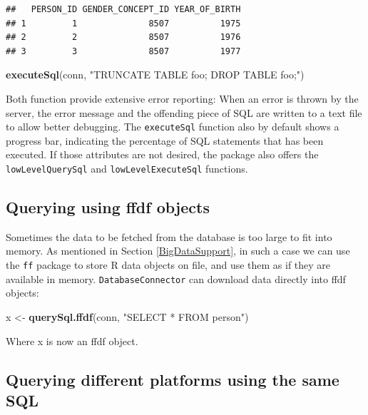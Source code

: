 \documentclass[11pt]{book}
\newenvironment{Shaded}{\begin{snugshade}}{\end{snugshade}}
\newcommand{\KeywordTok}[1]{\textcolor[rgb]{0.13,0.29,0.53}{\textbf{#1}}}
\newcommand{\NormalTok}[1]{#1}
\newcommand{\StringTok}[1]{\textcolor[rgb]{0.31,0.60,0.02}{#1}}
\theoremstyle{definition}
\theoremstyle{definition}
\theoremstyle{definition}
\theoremstyle{remark}
\begin{document}
\begin{verbatim}
##   PERSON_ID GENDER_CONCEPT_ID YEAR_OF_BIRTH
## 1         1              8507          1975
## 2         2              8507          1976
## 3         3              8507          1977
\end{verbatim}

\begin{Shaded}
\begin{Highlighting}[]
\KeywordTok{executeSql}\NormalTok{(conn, }\StringTok{"TRUNCATE TABLE foo; DROP TABLE foo;"}\NormalTok{)}
\end{Highlighting}
\end{Shaded}

Both function provide extensive error reporting: When an error is thrown by the server, the error message and the offending piece of SQL are written to a text file to allow better debugging. The \texttt{executeSql} function also by default shows a progress bar, indicating the percentage of SQL statements that has been executed. If those attributes are not desired, the package also offers the \texttt{lowLevelQuerySql} and \texttt{lowLevelExecuteSql} functions.

\hypertarget{querying-using-ffdf-objects}{%
\subsection{Querying using ffdf objects}\label{querying-using-ffdf-objects}}

Sometimes the data to be fetched from the database is too large to fit into memory. As mentioned in Section \ref{BigDataSupport}, in such a case we can use the \texttt{ff} package to store R data objects on file, and use them as if they are available in memory. \texttt{DatabaseConnector} can download data directly into ffdf objects:

\begin{Shaded}
\begin{Highlighting}[]
\NormalTok{x <-}\StringTok{ }\KeywordTok{querySql.ffdf}\NormalTok{(conn, }\StringTok{"SELECT * FROM person"}\NormalTok{)}
\end{Highlighting}
\end{Shaded}

Where x is now an ffdf object.

\hypertarget{querying-different-platforms-using-the-same-sql}{%
\subsection{Querying different platforms using the same SQL}\label{querying-different-platforms-using-the-same-sql}}
\end{document}
